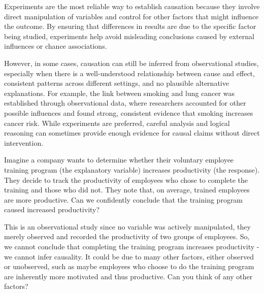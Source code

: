 \documentclass[
  letterpaper,
]{book}
\begin{document}
\begin{tcolorbox}[enhanced jigsaw, titlerule=0mm, rightrule=.15mm, toptitle=1mm, coltitle=black, opacityback=0, colback=white, arc=.35mm, bottomtitle=1mm, colbacktitle=quarto-callout-warning-color!10!white, title={Establishing causality through observation is possible, but a bit more
difficult.}, left=2mm, bottomrule=.15mm, colframe=quarto-callout-warning-color-frame, breakable, toprule=.15mm, leftrule=.75mm, opacitybacktitle=0.6]

Experiments are the most reliable way to establish causation because
they involve direct manipulation of variables and control for other
factors that might influence the outcome. By ensuring that differences
in results are due to the specific factor being studied, experiments
help avoid misleading conclusions caused by external influences or
chance associations.

However, in some cases, causation can still be inferred from
observational studies, especially when there is a well-understood
relationship between cause and effect, consistent patterns across
different settings, and no plausible alternative explanations. For
example, the link between smoking and lung cancer was established
through observational data, where researchers accounted for other
possible influences and found strong, consistent evidence that smoking
increases cancer risk. While experiments are preferred, careful analysis
and logical reasoning can sometimes provide enough evidence for causal
claims without direct intervention.

\end{tcolorbox}

Imagine a company wants to determine whether their voluntary employee
training program (the explanatory variable) increases productivity (the
response). They decide to track the productivity of employees who chose
to complete the training and those who did not. They note that, on
average, trained employees are more productive. Can we confidently
conclude that the training program caused increased productivity?

This is an observational study since no variable was actively
manipulated, they merely observed and recorded the productivity of two
groups of employees. So, we cannot conclude that completing the training
program increases productivity - we cannot infer causality. It could be
due to many other factors, either observed or unobserved, such as maybe
employees who choose to do the training program are inherently more
motivated and thus productive. Can you think of any other factors?
\end{document}

